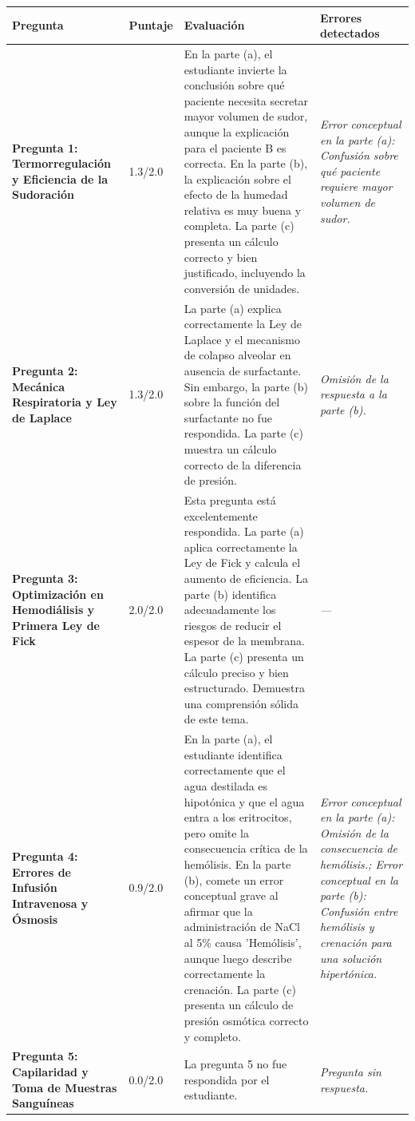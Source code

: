 \documentclass[11pt,a4paper]{article}
\begin{document}
\begin{longtable}{>{\bfseries}p{2.8cm} p{1.6cm} p{7.0cm} p{2.8cm}}
  \toprule
  \textbf{Pregunta} & \textbf{Puntaje} & \textbf{Evaluación} & \textbf{Errores detectados} \\
  \midrule
  \endhead
  \bottomrule
  \endfoot
    \textbf{Pregunta 1: Termorregulación y Eficiencia de la Sudoración} & 1.3/2.0 & En la parte (a), el estudiante invierte la conclusión sobre qué paciente necesita secretar mayor volumen de sudor, aunque la explicación para el paciente B es correcta. En la parte (b), la explicación sobre el efecto de la humedad relativa es muy buena y completa. La parte (c) presenta un cálculo correcto y bien justificado, incluyendo la conversión de unidades. & \textit{Error conceptual en la parte (a): Confusión sobre qué paciente requiere mayor volumen de sudor.} \\
    \midrule
    \textbf{Pregunta 2: Mecánica Respiratoria y Ley de Laplace} & 1.3/2.0 & La parte (a) explica correctamente la Ley de Laplace y el mecanismo de colapso alveolar en ausencia de surfactante. Sin embargo, la parte (b) sobre la función del surfactante no fue respondida. La parte (c) muestra un cálculo correcto de la diferencia de presión. & \textit{Omisión de la respuesta a la parte (b).} \\
    \midrule
    \textbf{Pregunta 3: Optimización en Hemodiálisis y Primera Ley de Fick} & 2.0/2.0 & Esta pregunta está excelentemente respondida. La parte (a) aplica correctamente la Ley de Fick y calcula el aumento de eficiencia. La parte (b) identifica adecuadamente los riesgos de reducir el espesor de la membrana. La parte (c) presenta un cálculo preciso y bien estructurado. Demuestra una comprensión sólida de este tema. & \textit{---} \\
    \midrule
    \textbf{Pregunta 4: Errores de Infusión Intravenosa y Ósmosis} & 0.9/2.0 & En la parte (a), el estudiante identifica correctamente que el agua destilada es hipotónica y que el agua entra a los eritrocitos, pero omite la consecuencia crítica de la hemólisis. En la parte (b), comete un error conceptual grave al afirmar que la administración de NaCl al 5\% causa 'Hemólisis', aunque luego describe correctamente la crenación. La parte (c) presenta un cálculo de presión osmótica correcto y completo. & \textit{Error conceptual en la parte (a): Omisión de la consecuencia de hemólisis.; Error conceptual en la parte (b): Confusión entre hemólisis y crenación para una solución hipertónica.} \\
    \midrule
    \textbf{Pregunta 5: Capilaridad y Toma de Muestras Sanguíneas} & 0.0/2.0 & La pregunta 5 no fue respondida por el estudiante. & \textit{Pregunta sin respuesta.} \\
    \midrule
\end{longtable}
\end{document}
